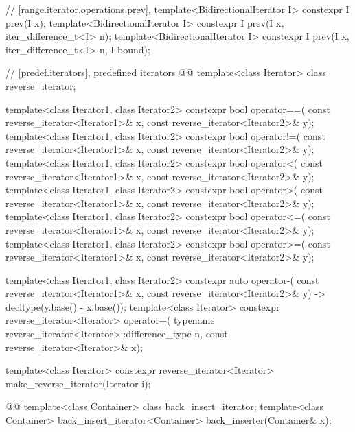 \begin{addedblock}
\begin{codeblock}
{    // \ref{range.iterator.operations.prev}, 
    template<BidirectionalIterator I>
      constexpr I prev(I x);
    template<BidirectionalIterator I>
      constexpr I prev(I x, iter_difference_t<I> n);
    template<BidirectionalIterator I>
      constexpr I prev(I x, iter_difference_t<I> n, I bound);
  }
\end{codeblock}\end{addedblock}\begin{codeblock}

  // \ref{predef.iterators}, predefined iterators 
  @@
  template<class Iterator> class reverse_iterator;

  template<class Iterator1, class Iterator2>
    constexpr bool operator==(
      const reverse_iterator<Iterator1>& x,
      const reverse_iterator<Iterator2>& y);
  template<class Iterator1, class Iterator2>
    constexpr bool operator!=(
      const reverse_iterator<Iterator1>& x,
      const reverse_iterator<Iterator2>& y);
  template<class Iterator1, class Iterator2>
    constexpr bool operator<(
      const reverse_iterator<Iterator1>& x,
      const reverse_iterator<Iterator2>& y);
  template<class Iterator1, class Iterator2>
    constexpr bool operator>(
      const reverse_iterator<Iterator1>& x,
      const reverse_iterator<Iterator2>& y);
  template<class Iterator1, class Iterator2>
    constexpr bool operator<=(
      const reverse_iterator<Iterator1>& x,
      const reverse_iterator<Iterator2>& y);
  template<class Iterator1, class Iterator2>
    constexpr bool operator>=(
      const reverse_iterator<Iterator1>& x,
      const reverse_iterator<Iterator2>& y);

  template<class Iterator1, class Iterator2>
    constexpr auto operator-(
      const reverse_iterator<Iterator1>& x,
      const reverse_iterator<Iterator2>& y) -> decltype(y.base() - x.base());
  template<class Iterator>
    constexpr reverse_iterator<Iterator>
      operator+(
    typename reverse_iterator<Iterator>::difference_type n,
    const reverse_iterator<Iterator>& x);

  template<class Iterator>
    constexpr reverse_iterator<Iterator> make_reverse_iterator(Iterator i);

  @@
  template<class Container> class back_insert_iterator;
  template<class Container>
    back_insert_iterator<Container> back_inserter(Container& x);


\end{codeblock}
